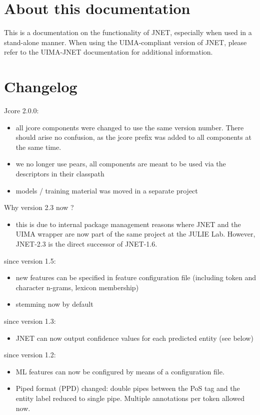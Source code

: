 \documentclass[11pt,a4paper,halfparskip]{scrartcl}
\begin{document}
\section{About this documentation}
This is a documentation on the functionality of JNET, especially when
used in a stand-alone manner. When using the UIMA-compliant version of
JNET, please refer to the UIMA-JNET documentation for additional
information.

\section{Changelog}

Jcore 2.0.0:
\begin{itemize}
\item all jcore components were changed to use the same version number. There should arise no confusion, as the jcore prefix was added to all components at the same time.
\item we no longer use pears, all components are meant to be used via the descriptors in their classpath
\item models / training material was moved in a separate project
\end{itemize}

Why version 2.3 now ?
\begin{itemize}
\item this is due to internal package management reasons where JNET
  and the UIMA wrapper are now part of the same project at the JULIE
  Lab. However, JNET-2.3 is the direct successor of JNET-1.6.
\end{itemize}

since version 1.5:
\begin{itemize}
\item new features can be specified in feature configuration file
  (including token and character n-grams, lexicon membership)
\item stemming now by default
\end{itemize}


since version 1.3:
\begin{itemize}
\item JNET can now output confidence values for each predicted entity
  (see below)
\end{itemize}

since version 1.2:
\begin{itemize}
\item ML features can now be configured by means of a configuration
  file.
\item Piped format (PPD) changed: double pipes between the PoS tag and
  the entity label reduced to single pipe. Multiple annotations per
  token allowed now.
\end{itemize}
\end{document}
